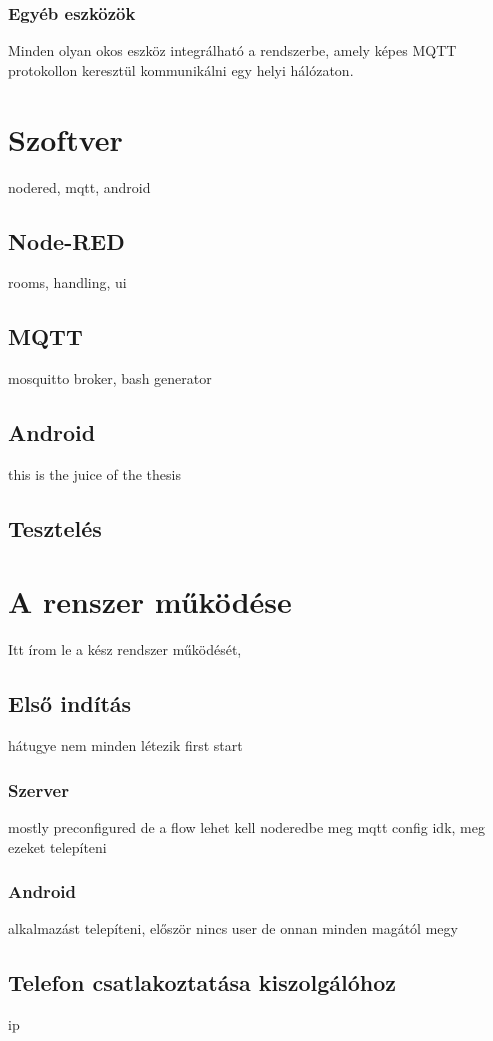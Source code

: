 \documentclass[
]{thesis-ekf}
\theoremstyle{definition}
\theoremstyle{remark}
\begin{document}
\subsection{Egyéb eszközök}
Minden olyan okos eszköz integrálható a rendszerbe, amely képes MQTT protokollon keresztül kommunikálni egy helyi hálózaton.



\chapter{Szoftver}
nodered, mqtt, android
\section{Node-RED}
rooms, handling, ui
\section{MQTT}
mosquitto broker, bash generator
\section{Android}
this is the juice of the thesis
\section{Tesztelés}



\chapter{A renszer működése}
Itt írom le a kész rendszer működését, 
\section{Első indítás}
hátugye nem minden létezik first start
\subsection{Szerver}
mostly preconfigured de a flow lehet kell noderedbe meg mqtt config idk, meg ezeket telepíteni
\subsection{Android}
alkalmazást telepíteni, először nincs user de onnan minden magától megy
\section{Telefon csatlakoztatása kiszolgálóhoz}
ip
\end{document}

